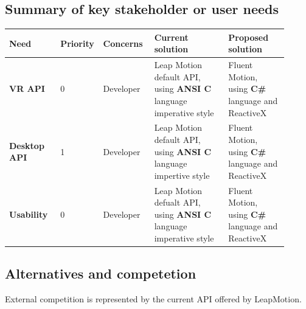 \documentclass[12pt,a4paper,twoside]{report}
\begin{document}
\subsection{Summary of key stakeholder or user needs}

\begin{table}[h]
  \centering
  \begin{tabular}{| m{0.18\linewidth} | m{0.08\linewidth} | m{0.18\linewidth} | m{0.26\linewidth} | m{0.21\linewidth} | }
    \hline
    \rowcolor{lightgray} Need & Priority & Concerns & Current solution & Proposed solution \\
    \hline
    \textbf{VR API} & 0 & Developer & Leap Motion default API, using \textbf{ANSI C} language imperative style & Fluent Motion, using \textbf{C\#} language and ReactiveX \\
    \hline
    \textbf{Desktop API} & 1 & Developer & Leap Motion default API, using \textbf{ANSI C} language impertive style & Fluent Motion, using \textbf{C\#} language and ReactiveX \\
    \hline
    \textbf{Usability} & 0 & Developer & Leap Motion defualt API, using \textbf{ANSI C} language imperative style & Fluent Motion, using \textbf{C\#} language and ReactiveX \\
    \hline
  \end{tabular}
\end{table}

\subsection{Alternatives and competetion}
External competition is represented by the current API offered by LeapMotion.
\end{document}
